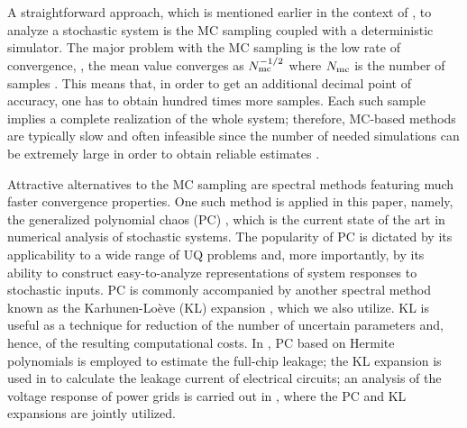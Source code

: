 

A straightforward approach, which is mentioned earlier in the context of \cite{chandra2010}, to analyze a stochastic system is the MC sampling coupled with a deterministic simulator. The major problem with the MC sampling is the low rate of convergence, \eg, the mean value converges as $N_\text{mc}^{-{{1}/{2}}}$ where $N_\text{mc}$ is the number of samples \cite{xiu2010, maitre2010}. This means that, in order to get an additional decimal point of accuracy, one has to obtain hundred times more samples. Each such sample implies a complete realization of the whole system; therefore, MC-based methods are typically slow and often infeasible since the number of needed simulations can be extremely large in order to obtain reliable estimates \cite{diaz-emparanza2002}.

Attractive alternatives to the MC sampling are spectral methods \cite{xiu2010, maitre2010} featuring much faster convergence properties. One such method is applied in this paper, namely, the generalized polynomial chaos (PC) \cite{xiu2002}, which is the current state of the art in numerical analysis of stochastic systems. The popularity of PC is dictated by its applicability to a wide range of UQ problems and, more importantly, by its ability to construct easy-to-analyze representations of system responses to stochastic inputs. PC is commonly accompanied by another spectral method known as the Karhunen-Lo\`{e}ve (KL) expansion \cite{ghanem1991}, which we also utilize. KL is useful as a technique for reduction of the number of uncertain parameters and, hence, of the resulting computational costs. In \cite{shen2009}, PC based on Hermite polynomials is employed to estimate the full-chip leakage; the KL expansion is used in \cite{bhardwaj2006} to calculate the leakage current of electrical circuits; an analysis of the voltage response of power grids is carried out in \cite{ghanta2006}, where the PC and KL expansions are jointly utilized.

